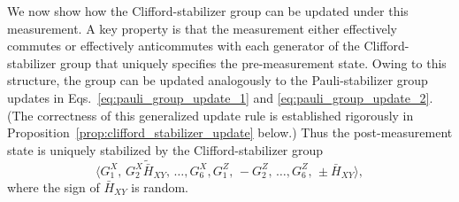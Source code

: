 \documentclass[
 reprint,
 amsmath,amssymb,
 pra,superscriptaddress, nofootinbib
]{revtex4-2}
\theoremstyle{definition}
\theoremstyle{plain}
\begin{document}
We now show how the Clifford-stabilizer group can be updated under this measurement. A key property is that the measurement either effectively commutes or effectively anticommutes with each generator of the Clifford-stabilizer group that uniquely specifies the pre-measurement state. Owing to this structure, the group can be updated analogously to the Pauli-stabilizer group updates in Eqs.~\eqref{eq:pauli_group_update_1} and \eqref{eq:pauli_group_update_2}.  (The correctness of this generalized update rule is established rigorously in Proposition~\ref{prop:clifford_stabilizer_update} below.)
Thus the post-measurement state is uniquely stabilized by the Clifford-stabilizer group
\begin{equation}
\langle G^X_1,\, G^X_2\widetilde{\bar{H}}_{XY},\,\ldots, G^X_6,G^Z_1,\, -G^Z_2,\,\ldots, G^Z_6, \,\pm \bar{H}_{XY}\rangle,
\end{equation}
where the sign of $\bar{H}_{XY}$ is random.
\end{document}
